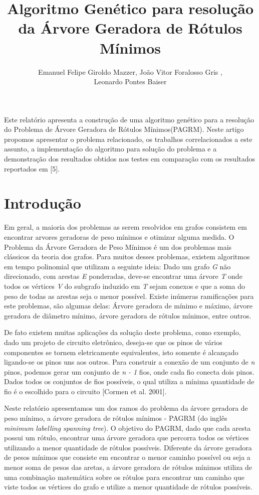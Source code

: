 \documentclass[12pt]{article}
\title{Algoritmo Genético para resolução da Árvore Geradora de Rótulos Mínimos}
\author{Emanuel Felipe Giroldo Mazzer\inst{1}, João Vitor Foralosso Gris \inst{1}, \\ Leonardo Pontes Baiser \inst{1}}
\begin{document}
	\maketitle

	\begin{resumo}
		Este relatório apresenta a construção de uma algoritmo genético para a resolução do Problema de Árvore Geradora de Rótulos Mínimos(PAGRM). Neste artigo propomos apresentar o problema relacionado, os trabalhos correlacionados a este assunto, a implementação do algoritmo para solução do problema e a demonstração dos resultados obtidos nos testes em comparação com os resultados reportados em [5].
	\end{resumo}
	

	\section{Introdução}\label{sec:introducao}

	\noindent Em geral, a maioria dos problemas as serem resolvidos em grafos consistem em encontrar arvores geradoras de peso mínimos e otimizar alguma medida. O Problema da Árvore Geradora de Peso Mínimos é um dos problemas mais clássicos da teoria dos grafos. Para muitos desses problemas, existem algoritmos em tempo polinomial que utilizam a seguinte ideia: Dado um grafo \textit{G} não direcionado, com arestas \textit{E} ponderadas, deve-se encontrar uma árvore \textit{T} onde todos os vértices \textit{V} do subgrafo induzido em \textit{T} sejam conexos e que a soma do peso de todas as arestas seja o menor possível. Existe inúmeras ramificações para este problemas, são algumas delas: Árvore geradora de mínimo e máximo, árvore geradora de diâmetro mínimo, árvore geradora de rótulos mínimos, entre outros. 
	
	De fato existem muitas aplicações da solução deste problema, como exemplo, dado um projeto de circuito eletrônico, deseja-se que os pinos de vários componentes se tornem eletricamente equivalentes, isto somente é alcançado ligando-se os pinos uns aos outros. Para construir a conexão de um conjunto de \textit{n} pinos, podemos gerar um conjunto de \textit{n - 1} fios, onde cada fio conecta dois pinos. Dados todos os conjuntos de fios possíveis, o qual utiliza a mínima quantidade de fio é o escolhido para o circuito [Cormen et al. 2001].

	Neste relatório apresentamos um dos ramos do problema da árvore geradora de peso mínimo, a árvore geradora de rótulos mínimos - PAGRM (do inglês \textit{minimum labelling spanning tree}). O objetivo do PAGRM, dado que cada aresta possui um rótulo, encontrar uma árvore geradora que percorra todos os vértices utilizando a menor quantidade de rótulos possíveis. Diferente da árvore geradora de pesos mínimos que consiste em encontrar o menor caminho possível ou seja a menor soma de pesos das aretas, a árvore geradora de rótulos mínimos utiliza de uma combinação matemática sobre os rótulos para encontrar um caminho que viste todos os vértices do grafo e utilize a menor quantidade de rótulos possíveis.
	
\end{document}
